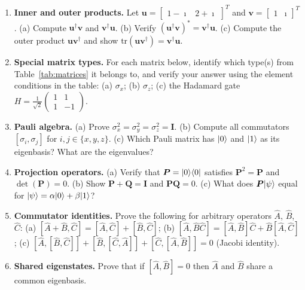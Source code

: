 \begin{enumerate}

\item \textbf{Inner and outer products.}
  Let $\bm{u}=\begin{bmatrix}1-\imath & 2+\imath\end{bmatrix}^T$ and
  $\bm{v}=\begin{bmatrix}1 & \imath\end{bmatrix}^T$.
  (a) Compute $\bm{u}^\dagger\bm{v}$ and $\bm{v}^\dagger\bm{u}$.
  (b) Verify $(\bm{u}^\dagger\bm{v})^*=\bm{v}^\dagger\bm{u}$.
  (c) Compute the outer product $\bm{u}\bm{v}^\dagger$ and
      show $\mathrm{tr}(\bm{u}\bm{v}^\dagger)=\bm{v}^\dagger\bm{u}$.

\item \textbf{Special matrix types.}
  For each matrix below, identify which type(s) from
  Table~\ref{tab:matrices} it belongs to, and verify your answer using
  the element conditions in the table:
  (a) $\sigma_x$;\;
  (b) $\sigma_z$;\;
  (c) the Hadamard gate $H=\frac{1}{\sqrt{2}}\begin{pmatrix}1&1\\1&-1\end{pmatrix}$.

\item \textbf{Pauli algebra.}
  (a) Prove $\sigma_x^2=\sigma_y^2=\sigma_z^2=\bm{I}$.
  (b) Compute all commutators $[\sigma_i,\sigma_j]$ for
      $i,j\in\{x,y,z\}$.
  (c) Which Pauli matrix has $\vert 0 \rangle$ and $\vert 1 \rangle$ as its
      eigenbasis? What are the eigenvalues?

\item \textbf{Projection operators.}
  (a) Verify that $\bm{P}=\vert 0 \rangle\langle 0 \vert$ satisfies $\bm{P}^2=\bm{P}$
      and $\det(\bm{P})=0$.
  (b) Show $\bm{P}+\bm{Q}=\bm{I}$ and $\bm{P}\bm{Q}=0$.
  (c) What does $\bm{P}\vert \psi \rangle$ equal for
      $\vert \psi \rangle=\alpha\vert 0 \rangle+\beta\vert 1 \rangle$?

\item \textbf{Commutator identities.}
  Prove the following for arbitrary operators $\hat{A}$, $\hat{B}$,
  $\hat{C}$:
  (a) $[\hat{A}+\hat{B},\hat{C}]=[\hat{A},\hat{C}]+[\hat{B},\hat{C}]$;
  (b) $[\hat{A},\hat{B}\hat{C}]=[\hat{A},\hat{B}]\hat{C}+\hat{B}[\hat{A},\hat{C}]$;
  (c) $[\hat{A},[\hat{B},\hat{C}]]+[\hat{B},[\hat{C},\hat{A}]]+[\hat{C},[\hat{A},\hat{B}]]=0$
      (Jacobi identity).

\item \textbf{Shared eigenstates.}
  Prove that if $[\hat{A},\hat{B}]=0$ then $\hat{A}$ and $\hat{B}$
  share a common eigenbasis.


\end{enumerate}
